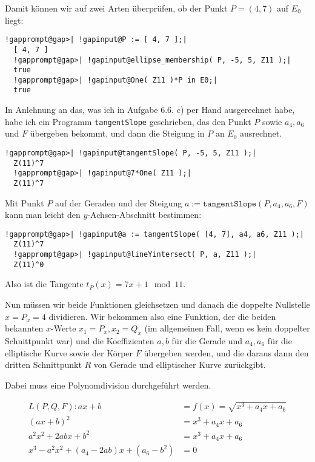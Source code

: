 \begin{enumerate}[label=\alph*)]
Damit können wir auf zwei Arten überprüfen, ob der Punkt $P = (4, 7)$ auf $E_{0}$ liegt:

\begin{Verbatim}[commandchars=!@|,fontsize=\small,frame=single,label=Example]
  !gapprompt@gap>| !gapinput@P := [ 4, 7 ];|
  [ 4, 7 ]
  !gapprompt@gap>| !gapinput@ellipse_membership( P, -5, 5, Z11 );|
  true
  !gapprompt@gap>| !gapinput@One( Z11 )*P in E0;|
  true
\end{Verbatim}

In Anlehnung an das, was ich in Aufgabe 6.6. c) per Hand ausgerechnet habe, habe ich ein Programm \texttt{tangentSlope} geschrieben,
das den Punkt $P$ sowie $a_{4}, a_{6}$ und $F$ übergeben bekommt, und dann die Steigung in $P$ an $E_{0}$ ausrechnet.

\begin{Verbatim}[commandchars=!@|,fontsize=\small,frame=single,label=Example]
  !gapprompt@gap>| !gapinput@tangentSlope( P, -5, 5, Z11 );|
  Z(11)^7
  !gapprompt@gap>| !gapinput@7*One( Z11 );|
  Z(11)^7
\end{Verbatim}

Mit Punkt $P$ auf der Geraden und der Steigung $a := \mathtt{tangentSlope}( P, a_{4}, a_{6}, F )$ kann man leicht
den $y$-Achsen-Abschnitt bestimmen:

\begin{Verbatim}[commandchars=!@|,fontsize=\small,frame=single,label=Example]
  !gapprompt@gap>| !gapinput@a := tangentSlope( [4, 7], a4, a6, Z11 );|
  Z(11)^7
  !gapprompt@gap>| !gapinput@lineYintersect( P, a, Z11 );|
  Z(11)^0
\end{Verbatim}

Also ist die Tangente $t_{P}(x) = 7x + 1 \mod 11$.

Nun müssen wir beide Funktionen gleichsetzen und danach die doppelte Nullstelle $x = P_{x} = 4$ dividieren.
Wir bekommen also eine Funktion, der die beiden bekannten $x$-Werte $x_{1} = P_{x}, x_{2} = Q_{x}$ (im allgemeinen
Fall, wenn es kein doppelter Schnittpunkt war) und die Koeffizienten $a, b$ für die Gerade und $a_{4}, a_{6}$ für die elliptische Kurve sowie der
Körper $F$ übergeben werden, und die daraus dann den dritten Schnittpunkt $R$ von Gerade und elliptischer Kurve zurückgibt.

Dabei muss eine Polynomdivision durchgeführt werden.

\begin{align*}
L(P,Q,F): ax + b &= f(x) = \sqrt{x^{3} + a_{4}x + a_{6}} \\
(ax + b)^{2} &= x^{3} + a_{4}x + a_{6} \\
a^{2}x^{2} + 2abx + b^{2} &= x^{3} + a_{4}x + a_{6} \\
x^{3} - a^{2}x^{2} + (a_{4} - 2ab)x + (a_{6} - b^{2}) &= 0
\end{align*}


\end{enumerate}
